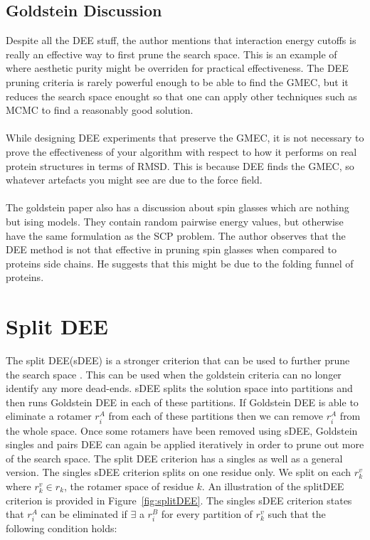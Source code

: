 \documentclass{article}
\begin{document}
\subsection{Goldstein Discussion}
Despite all the DEE stuff, the author mentions that interaction energy cutoffs is really an effective way to first prune the search space. This is an example of where aesthetic purity might be overriden for practical effectiveness. The DEE pruning criteria is rarely powerful enough to be able to find the GMEC, but it reduces the search space enought so that one can apply other techniques such as MCMC to find a reasonably good solution. 
\\
\\
While designing DEE experiments that preserve the GMEC, it is not necessary to prove the effectiveness of your algorithm with respect to how it performs on real protein structures in terms of RMSD. This is because DEE finds the GMEC, so whatever artefacts you might see are due to the force field. 
\\
\\
The goldstein paper also has a discussion about spin glasses which are nothing but ising models. They contain random pairwise energy values, but otherwise have the same formulation as the SCP problem. The author observes that the DEE method is not that effective in pruning spin glasses when compared to proteins side chains. He suggests that this might be due to the folding funnel of proteins.

\section{Split DEE}
The split DEE(sDEE) is a stronger criterion that can be used to further prune the search space \cite{Pierce2000}. This can be used when the goldstein criteria can no longer identify any more dead-ends. sDEE splits the solution space into partitions and then runs Goldstein DEE in each of these partitions. If Goldstein DEE is able to eliminate a rotamer $r_i^A$ from each of these partitions then we can remove $r_i^A$ from the whole space. Once some rotamers have been removed using sDEE, Goldstein singles and pairs DEE can again be applied iteratively in order to prune out more of the search space. The split DEE criterion has a singles as well as a general version. The singles sDEE criterion splits on one residue only. We split on each $r_k^v$ where $r_k^v \in r_k$, the rotamer space of residue $k$. An illustration of the splitDEE criterion is provided in Figure~\ref{fig:splitDEE}. The singles sDEE criterion states that $r_i^A$ can be eliminated if $\exists$ a $r_i^B$ for every partition of $r_k^v$ such that the following condition holds: 
\end{document}
